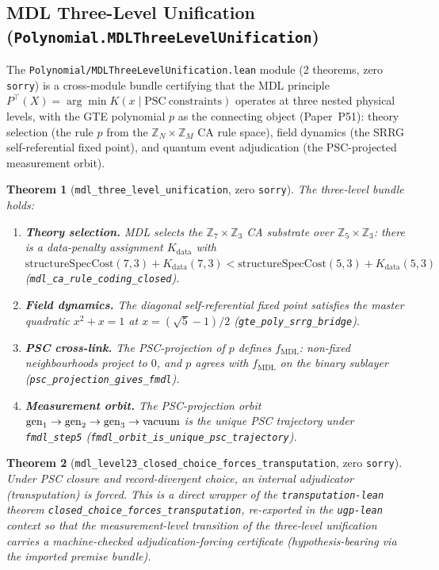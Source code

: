 \documentclass[11pt,a4paper]{article}
\newtheorem{theorem}{Theorem}[section]
\theoremstyle{definition}
\begin{document}
\subsection{MDL Three-Level Unification (\texttt{Polynomial.MDLThreeLevelUnification})}\label{subsec:mdl-three-level}

The \texttt{Polynomial/MDLThreeLevelUnification.lean} module (2 theorems, zero
\lstinline|sorry|) is a cross-module bundle certifying that the MDL principle
$P^\top(X) = \arg\min K(x \mid \mathrm{PSC\ constraints})$ operates at three
nested physical levels, with the GTE polynomial $p$ as the connecting object
(Paper~P51): theory selection (the rule $p$ from the $\mathbb{Z}_N \times
\mathbb{Z}_M$ CA rule space), field dynamics (the SRRG self-referential fixed
point), and quantum event adjudication (the PSC-projected measurement orbit).

\begin{theorem}[\lstinline|mdl_three_level_unification|, zero \texttt{sorry}]
The three-level bundle holds:
\begin{enumerate}[nosep]
\item \textbf{Theory selection.} MDL selects the
  $\mathbb{Z}_7\times\mathbb{Z}_3$ CA substrate over
  $\mathbb{Z}_5\times\mathbb{Z}_3$: there is a data-penalty assignment
  $K_{\mathrm{data}}$ with
  $\mathrm{structureSpecCost}(7,3) + K_{\mathrm{data}}(7,3) <
   \mathrm{structureSpecCost}(5,3) + K_{\mathrm{data}}(5,3)$
  (\lstinline|mdl_ca_rule_coding_closed|).
\item \textbf{Field dynamics.} The diagonal self-referential fixed point
  satisfies the master quadratic $x^2 + x = 1$ at
  $x = (\sqrt{5}-1)/2$ (\lstinline|gte_poly_srrg_bridge|).
\item \textbf{PSC cross-link.} The PSC-projection of $p$ defines
  $f_{\mathrm{MDL}}$: non-fixed neighbourhoods project to $0$, and $p$
  agrees with $f_{\mathrm{MDL}}$ on the binary sublayer
  (\lstinline|psc_projection_gives_fmdl|).
\item \textbf{Measurement orbit.} The PSC-projection orbit
  ${\rm gen}_1 \to {\rm gen}_2 \to {\rm gen}_3 \to {\rm vacuum}$ is the
  unique PSC trajectory under \lstinline|fmdl_step5|
  (\lstinline|fmdl_orbit_is_unique_psc_trajectory|).
\end{enumerate}
\end{theorem}

\begin{theorem}[\lstinline|mdl_level23_closed_choice_forces_transputation|, zero \texttt{sorry}]
Under PSC closure and record-divergent choice, an internal adjudicator
(transputation) is forced.  This is a direct wrapper of the
\texttt{transputation-lean} theorem
\lstinline|closed_choice_forces_transputation|, re-exported in the
\texttt{ugp-lean} context so that the measurement-level transition of the
three-level unification carries a machine-checked adjudication-forcing
certificate (hypothesis-bearing via the imported premise bundle).
\end{theorem}
\end{document}
